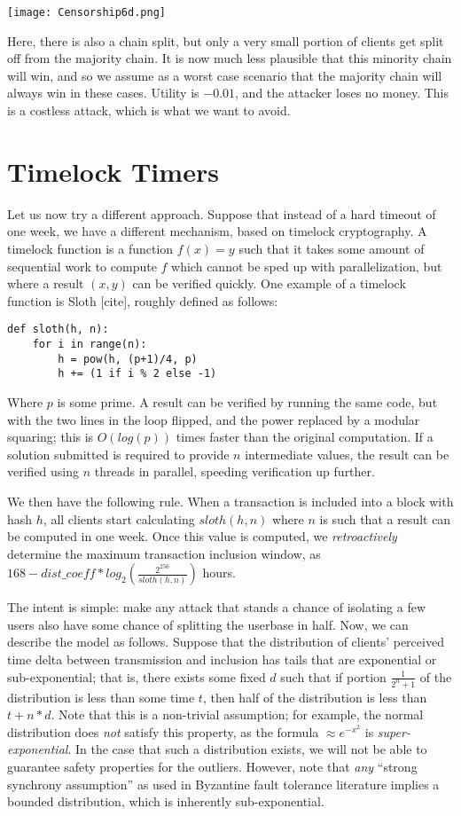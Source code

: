 \documentclass[12pt]{article}
\begin{document}
\texttt{[image: Censorship6d.png]}

Here, there is also a chain split, but only a very small portion of clients get split off from the majority chain. It is now much less plausible that this minority chain will win, and so we assume as a worst case scenario that the majority chain will always win in these cases. Utility is $-0.01$, and the attacker loses no money. This is a costless attack, which is what we want to avoid.

\section{Timelock Timers}

Let us now try a different approach. Suppose that instead of a hard timeout of one week, we have a different mechanism, based on timelock cryptography. A timelock function is a function $f(x) = y$ such that it takes some amount of sequential work to compute $f$ which cannot be sped up with parallelization, but where a result $(x, y)$ can be verified quickly. One example of a timelock function is Sloth [cite], roughly defined as follows:

\begin{verbatim}
def sloth(h, n):
    for i in range(n):
        h = pow(h, (p+1)/4, p)
        h += (1 if i % 2 else -1)
\end{verbatim}

Where $p$ is some prime. A result can be verified by running the same code, but with the two lines in the loop flipped, and the power replaced by a modular squaring; this is $O(log(p))$ times faster than the original computation. If a solution submitted is required to provide $n$ intermediate values, the result can be verified using $n$ threads in parallel, speeding verification up further.

We then have the following rule. When a transaction is included into a block with hash $h$, all clients start calculating $sloth(h, n)$ where $n$ is such that a result can be computed in one week. Once this value is computed, we \textit{retroactively} determine the maximum transaction inclusion window, as $168 - dist\_coeff * log_2(\frac{2^{256}}{sloth(h, n)})$ hours.

The intent is simple: make any attack that stands a chance of isolating a few users also have some chance of splitting the userbase in half. Now, we can describe the model as follows. Suppose that the distribution of clients' perceived time delta between transmission and inclusion has tails that are exponential or sub-exponential; that is, there exists some fixed $d$ such that if portion $\frac{1}{2^n+1}$ of the distribution is less than some time $t$, then half of the distribution is less than $t + n * d$. Note that this is a non-trivial assumption; for example, the normal distribution does \textit{not} satisfy this property, as the formula $\approx e^{-x^2}$ is \textit{super-exponential}. In the case that such a distribution exists, we will not be able to guarantee safety properties for the outliers. However, note that \textit{any} ``strong synchrony assumption'' as used in Byzantine fault tolerance literature implies a bounded distribution, which is inherently sub-exponential.
\end{document}

